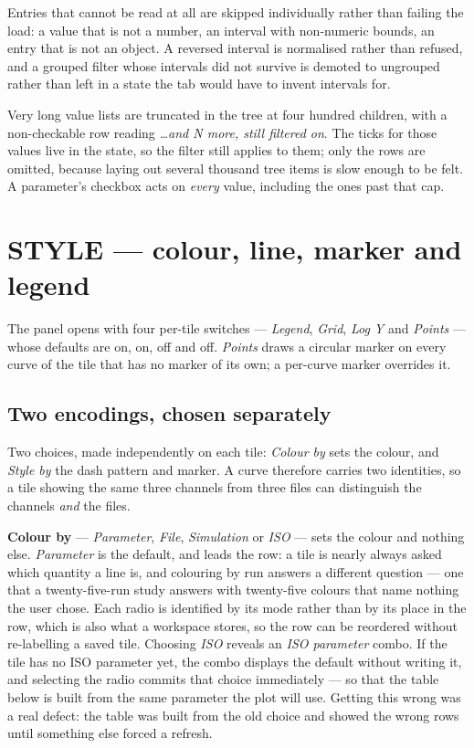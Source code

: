 \documentclass[11pt,a4paper,oneside]{report}
\begin{document}
Entries that cannot be read at all are skipped individually rather than failing
the load: a value that is not a number, an interval with non-numeric bounds, an
entry that is not an object. A reversed interval is normalised rather than
refused, and a grouped filter whose intervals did not survive is demoted to
ungrouped rather than left in a state the tab would have to invent intervals for.

Very long value lists are truncated in the tree at four hundred children, with a
non-checkable row reading \emph{\ldots and N more, still filtered on}. The ticks
for those values live in the state, so the filter still applies to them; only the
rows are omitted, because laying out several thousand tree items is slow enough
to be felt. A parameter's checkbox acts on \emph{every} value, including the ones
past that cap.

\section{STYLE --- colour, line, marker and legend}
\label{sec:style}

The panel opens with four per-tile switches --- \emph{Legend}, \emph{Grid},
\emph{Log Y} and \emph{Points} --- whose defaults are on, on, off and off.
\emph{Points} draws a circular marker on every curve of the tile that has no
marker of its own; a per-curve marker overrides it.

\subsection{Two encodings, chosen separately}

Two choices, made independently on each tile: \emph{Colour by} sets the colour,
and \emph{Style by} the dash pattern and marker. A curve therefore carries two
identities, so a tile showing the same three channels from three files can
distinguish the channels \emph{and} the files.

\textbf{Colour by} --- \emph{Parameter}, \emph{File}, \emph{Simulation} or
\emph{ISO} --- sets the colour and nothing else. \emph{Parameter} is the default, and leads the
row: a tile is nearly always asked which quantity a line is, and colouring by
run answers a different question --- one that a twenty-five-run study answers
with twenty-five colours that name nothing the user chose. Each radio is
identified by its mode rather than by its place in the row, which is also what
a workspace stores, so the row can be reordered without re-labelling a saved
tile. Choosing \emph{ISO} reveals an \emph{ISO parameter}
combo. If the tile has no ISO parameter yet, the combo displays the default
without writing it, and selecting the radio commits that choice immediately ---
so that the table below is built from the same parameter the plot will use.
Getting this wrong was a real defect: the table was built from the old choice and
showed the wrong rows until something else forced a refresh.
\end{document}
